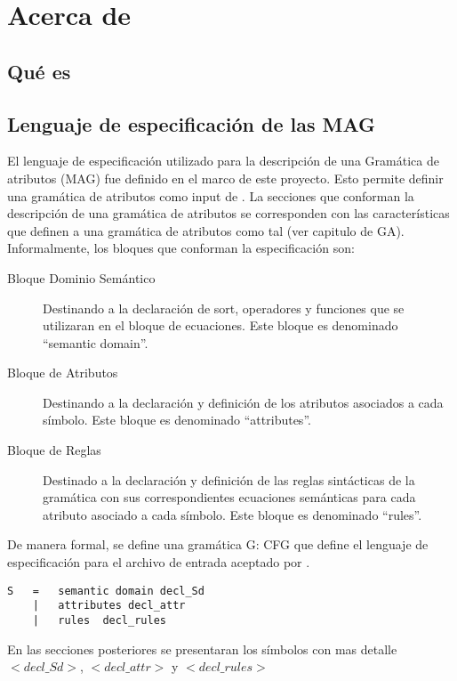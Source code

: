\chapter{Acerca de \maggen}
\label{chap:disen_}
\minitoc


\section{Qu\'e es \maggen}

\section{Lenguaje de especificaci\'on de las MAG}

El lenguaje de especificación utilizado para la descripción de una Gramática de atributos (MAG) fue definido en el marco de este proyecto. Esto permite definir una gramática de atributos como input de \maggen. 
La secciones que conforman la descripción de una gramática de atributos se corresponden con las características que definen a una gramática de atributos como tal (ver capitulo de GA). 
Informalmente, los bloques que conforman la especificación son:
\begin{description}
\item [Bloque Dominio Semántico] Destinando a la declaración de sort, operadores y funciones que se utilizaran en el bloque de ecuaciones. Este bloque es denominado ``semantic domain''.
\item [Bloque de Atributos] Destinando a la declaración y definición de los atributos asociados a cada símbolo. Este bloque es denominado ``attributes''.
\item [Bloque de Reglas] Destinado a la declaración y definición de las reglas sintácticas de la gramática con sus correspondientes ecuaciones semánticas para cada atributo asociado a cada símbolo. Este bloque es denominado ``rules''.
\end{description}
De manera formal, se define una gramática G: CFG que define el lenguaje de especificación para el archivo de entrada aceptado por \maggen.
\begin{center}
\lstset{language=inform}
\scriptsize
\begin{lstlisting}[frame=single]
S   =   semantic domain decl_Sd
    |   attributes decl_attr
    |   rules  decl_rules
\end{lstlisting}
\end{center}

En las secciones posteriores se presentaran los símbolos con mas detalle  \textit{$<decl\_Sd>$}, \textit{$<decl\_attr>$} y \textit{$<decl\_rules>$}

